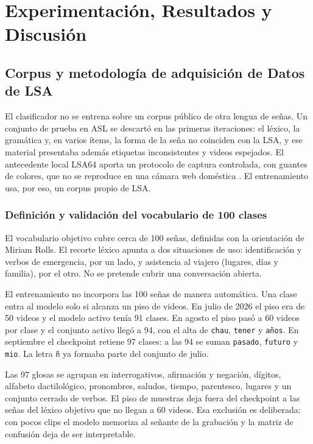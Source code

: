 

\chapter{Experimentación, Resultados y Discusión}

\section{Corpus y metodología de adquisición de Datos de LSA}

El clasificador no se entrena sobre un corpus público de otra lengua de señas. Un conjunto de prueba en ASL se descartó en las primeras iteraciones: el léxico, la gramática y, en varios ítems, la forma de la seña no coinciden con la LSA, y ese material presentaba además etiquetas inconsistentes y videos espejados. El antecedente local LSA64 aporta un protocolo de captura controlada, con guantes de colores, que no se reproduce en una cámara web doméstica \parencite{ronchetti2016lsa64}. El entrenamiento usa, por eso, un corpus propio de LSA.

\subsection{Definición y validación del vocabulario de 100 clases}

El vocabulario objetivo cubre cerca de 100 señas, definidas con la orientación de Miriam Rolls. El recorte léxico apunta a dos situaciones de uso: identificación y verbos de emergencia, por un lado, y asistencia al viajero (lugares, días y familia), por el otro. No se pretende cubrir una conversación abierta.

El entrenamiento no incorpora las 100 señas de manera automática. Una clase entra al modelo solo si alcanza un piso de videos. En julio de 2026 el piso era de 50 videos y el modelo activo tenía 91 clases. En agosto el piso pasó a 60 videos por clase y el conjunto activo llegó a 94, con el alta de \texttt{chau}, \texttt{tener} y \texttt{años}. En septiembre el checkpoint retiene 97 clases: a las 94 se suman \texttt{pasado}, \texttt{futuro} y \texttt{mio}. La letra \texttt{ñ} ya formaba parte del conjunto de julio.

Las 97 glosas se agrupan en interrogativos, afirmación y negación, dígitos, alfabeto dactilológico, pronombres, saludos, tiempo, parentesco, lugares y un conjunto cerrado de verbos. El piso de muestras deja fuera del checkpoint a las señas del léxico objetivo que no llegan a 60 videos. Esa exclusión es deliberada: con pocos clips el modelo memoriza al señante de la grabación y la matriz de confusión deja de ser interpretable.

